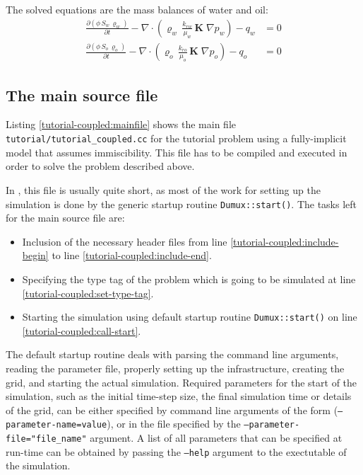 The solved equations are the mass balances of water and oil:
\begin{align}
  \label{massbalancewater}
  \frac {\partial (\phi \, S_{w}\, \varrho_{w})}{\partial t}
  -
  \nabla \cdot \left( \varrho_{w} \, \frac{k_{rw}}{\mu_{w}} \, \mathbf{K}\;\nabla p_w \right)
  -
  q_w
  & =
  0 \\
  \label{massbalanceoil}
  \frac {\partial (\phi \, S_{o}\, \varrho_{o})}{\partial t}
  -
  \nabla \cdot \left( \varrho_{o} \, \frac{k_{ro}}{\mu_{o}} \, \mathbf{K}\;\nabla p_o \right)
  -
  q_o 
  & =
  0
\end{align}

\subsection{The main source file}

Listing \ref{tutorial-coupled:mainfile} shows the main file
\texttt{tutorial/tutorial\_coupled.cc} for the tutorial problem using
a fully-implicit model that assumes immiscibility. This file has to be
compiled and executed in order to solve the problem described above.

\begin{lst}\label{tutorial-coupled:mainfile} \mbox{}
  
\end{lst}

In \eWoms, this file is usually quite short, as most of the work for
setting up the simulation is done by the generic startup routine
\texttt{Dumux::start()}. The tasks left for the main source file are:
\begin{itemize}
\item Inclusion of the necessary header files from line
  \ref{tutorial-coupled:include-begin} to line
  \ref{tutorial-coupled:include-end}.
\item Specifying the type tag of the problem which is going to be
  simulated at line \ref{tutorial-coupled:set-type-tag}.
\item Starting the simulation using default \eWoms startup routine
  \texttt{Dumux::start()} on line \ref{tutorial-coupled:call-start}.
\end{itemize}

The default \eWoms startup routine deals with parsing the command line
arguments, reading the parameter file, properly setting up the \Dune
infrastructure, creating the grid, and starting the actual simulation.
Required parameters for the start of the simulation, such as the
initial time-step size, the final simulation time or details of the
grid, can be either specified by command line arguments of the form
(\texttt{--parameter-name=value}), or in the file specified by the
\texttt{--parameter-file="file\_name"} argument. A list of all
parameters that can be specified at run-time can be obtained by passing
the \texttt{--help} argument to the exectutable of the simulation.

